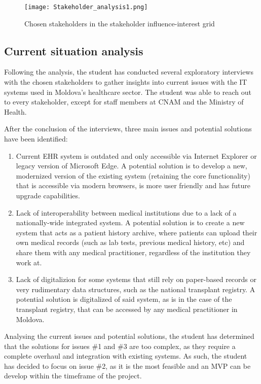 \begin{figure}[ht]
    \centering
    \texttt{[image: Stakeholder\_analysis1.png]}
    \caption{Chosen stakeholders in the stakeholder influence-interest grid}
    \label{fig:stakeholder_analysis1}
\end{figure}

\subsection{Current situation analysis}

Following the analysis, the student has conducted several exploratory interviews with the chosen stakeholders to gather insights into current issues with the IT systems used in Moldova's healthcare sector. The student was able to reach out to every stakeholder, except for staff members at CNAM and the Ministry of Health. 

After the conclusion of the interviews, three main issues and potential solutions have been identified:

\begin{enumerate}
    \item Current EHR system is outdated and only accessible via Internet Explorer or legacy version of Microsoft Edge. A potential solution is to develop a new, modernized version of the existing system (retaining the core functionality) that is accessible via modern browsers, is more user friendly and has future upgrade capabilities.
    \item Lack of interoperability between medical institutions due to a lack of a nationally-wide integrated system. A potential solution is to create a new system that acts as a patient history archive, where patients can upload their own medical records (such as lab tests, previous medical history, etc) and share them with any medical practitioner, regardless of the institution they work at. 
    \item Lack of digitalizion for some systems that still rely on paper-based records or very rudimentary data structures, such as the national transplant registry. A potential solution is digitalized of said system, as is in the case of the transplant registry, that can be accessed by any medical practitioner in Moldova.
\end{enumerate}

Analysing the current issues and potential solutions, the student has determined that the solutions for issues \#1 and \#3 are too complex, as they require a complete overhaul and integration with existing systems. As such, the student has decided to focus on issue \#2, as it is the most feasible and an MVP can be develop within the timeframe of the project. 

